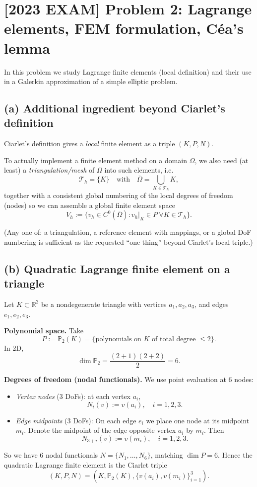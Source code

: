 \section*{[2023 EXAM] Problem 2: Lagrange elements, FEM formulation, Céa's lemma}

In this problem we study Lagrange finite elements (local definition) and their use in a
Galerkin approximation of a simple elliptic problem.

\subsection*{(a) Additional ingredient beyond Ciarlet's definition}

Ciarlet's definition gives a \emph{local} finite element as a triple \((K,P,N)\).

To actually implement a finite element method on a domain \(\Omega\), we also need (at least) a
\emph{triangulation/mesh} of \(\Omega\) into such elements, i.e.
\[
    \mathcal{T}_h = \{K\} \quad\text{with}\quad \overline{\Omega} = \bigcup_{K\in\mathcal{T}_h} K,
\]
together with a consistent global numbering of the local degrees of freedom (nodes) so we can
assemble a global finite element space
\[
    V_h := \{v_h\in C^0(\overline{\Omega}) : v_h|_K \in P \ \forall K\in\mathcal{T}_h\}.
\]

(Any one of: a triangulation, a reference element with mappings, or a global DoF numbering
is sufficient as the requested “one thing” beyond Ciarlet's local triple.)

\subsection*{(b) Quadratic Lagrange finite element on a triangle}

Let \(K\subset\mathbb{R}^2\) be a nondegenerate triangle with vertices
\(a_1,a_2,a_3\), and edges \(e_1,e_2,e_3\).

\textbf{Polynomial space.}
Take
\[
    P := \mathbb{P}_2(K)
    = \{ \text{polynomials on }K\text{ of total degree }\le 2\}.
\]
In 2D,
\[
    \dim \mathbb{P}_2 = \frac{(2+1)(2+2)}{2} = 6.
\]

\textbf{Degrees of freedom (nodal functionals).}
We use point evaluation at 6 nodes:

\begin{itemize}
    \item \emph{Vertex nodes} (3 DoFs): at each vertex \(a_i\),
          \[
              N_i(v) := v(a_i), \quad i=1,2,3.
          \]
    \item \emph{Edge midpoints} (3 DoFs):
          On each edge \(e_i\) we place one node at its midpoint \(m_i\).
          Denote the midpoint of the edge opposite vertex \(a_i\) by \(m_i\).
          Then
          \[
              N_{3+i}(v) := v(m_i), \quad i=1,2,3.
          \]
\end{itemize}
So we have 6 nodal functionals \(N=\{N_1,\dots,N_6\}\), matching \(\dim P=6\).
Hence the quadratic Lagrange finite element is the Ciarlet triple
\[
    (K,P,N) = (K,\mathbb{P}_2(K),\{v(a_i),v(m_i)\}_{i=1}^3).
\]

